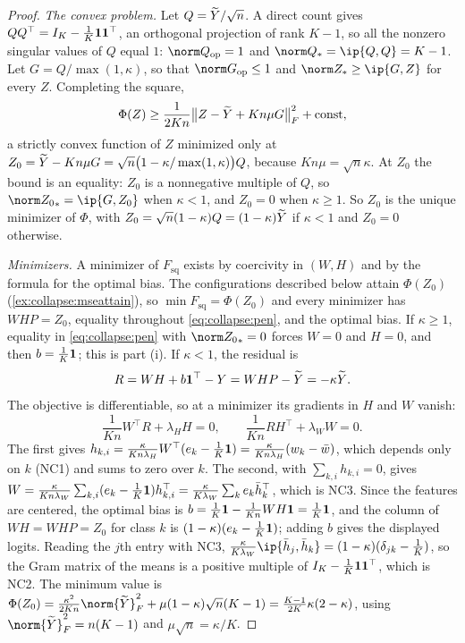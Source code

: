 \begin{refsection}
\begin{proof}
\emph{The convex problem.} Let $Q=\widetilde Y/\sqrt n$. A direct count gives $QQ^\top=I_K-\frac1K\mathbf 1\mathbf 1^\top$, an orthogonal projection of rank $K-1$, so all the nonzero singular values of $Q$ equal $1$: $\norm Q_{\op}=1$ and $\collapsenuc Q=\ip{Q,Q}=K-1$. Let $G=Q/\max(1,\kappa)$, so that $\norm G_{\op}\le1$ and $\collapsenuc Z\ge\ip{G,Z}$ for every $Z$. Completing the square,
\[
  \Phi(Z)\ge\frac1{2Kn}\bigl\|Z-\widetilde Y+Kn\mu G\bigr\|_F^2+\mathrm{const},
\]
a strictly convex function of $Z$ minimized only at $Z_0=\widetilde Y-Kn\mu G=\sqrt n\bigl(1-\kappa/\max(1,\kappa)\bigr)Q$, because $Kn\mu=\sqrt n\kappa$. At $Z_0$ the bound is an equality: $Z_0$ is a nonnegative multiple of $Q$, so $\collapsenuc{Z_0}=\ip{G,Z_0}$ when $\kappa<1$, and $Z_0=0$ when $\kappa\ge1$. So $Z_0$ is the unique minimizer of $\Phi$, with $Z_0=\sqrt n(1-\kappa)Q=(1-\kappa)\widetilde Y$ if $\kappa<1$ and $Z_0=0$ otherwise.

\emph{Minimizers.} A minimizer of $F_{\mathrm{sq}}$ exists by coercivity in $(W,H)$ and by the formula for the optimal bias. The configurations described below attain $\Phi(Z_0)$ (\cref{ex:collapse:mseattain}), so $\min F_{\mathrm{sq}}=\Phi(Z_0)$ and every minimizer has $WHP=Z_0$, equality throughout \eqref{eq:collapse:pen}, and the optimal bias. If $\kappa\ge1$, equality in \eqref{eq:collapse:pen} with $\collapsenuc{Z_0}=0$ forces $W=0$ and $H=0$, and then $b=\frac1K\mathbf 1$; this is part (i). If $\kappa<1$, the residual is
\[
  R=WH+b\mathbf 1^\top-Y=WHP-\widetilde Y=-\kappa\widetilde Y .
\]
The objective is differentiable, so at a minimizer its gradients in $H$ and $W$ vanish:
\[
  \frac1{Kn}W^\top R+\lambda_HH=0,\qquad\frac1{Kn}RH^\top+\lambda_WW=0 .
\]
The first gives $h_{k,i}=\frac\kappa{Kn\lambda_H}W^\top(e_k-\frac1K\mathbf 1)=\frac\kappa{Kn\lambda_H}(w_k-\bar w)$, which depends only on $k$ (NC1) and sums to zero over $k$. The second, with $\sum_{k,i}h_{k,i}=0$, gives $W=\frac\kappa{Kn\lambda_W}\sum_{k,i}(e_k-\frac1K\mathbf 1)h_{k,i}^\top=\frac\kappa{K\lambda_W}\sum_ke_k\bar h_k^\top$, which is NC3. Since the features are centered, the optimal bias is $b=\frac1K\mathbf 1-\frac1{Kn}WH\mathbf 1=\frac1K\mathbf 1$, and the column of $WH=WHP=Z_0$ for class $k$ is $(1-\kappa)(e_k-\frac1K\mathbf 1)$; adding $b$ gives the displayed logits. Reading the $j$th entry with NC3, $\frac\kappa{K\lambda_W}\ip{\bar h_j,\bar h_k}=(1-\kappa)(\delta_{jk}-\frac1K)$, so the Gram matrix of the means is a positive multiple of $I_K-\frac1K\mathbf 1\mathbf 1^\top$, which is NC2. The minimum value is $\Phi(Z_0)=\frac{\kappa^2}{2Kn}\norm{\collapseYt}_F^2+\mu(1-\kappa)\sqrt n(K-1)=\frac{K-1}{2K}\kappa(2-\kappa)$, using $\norm{\collapseYt}_F^2=n(K-1)$ and $\mu\sqrt n=\kappa/K$.
\end{proof}


\end{refsection}
